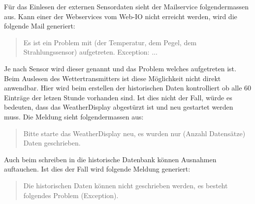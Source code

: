 Für das Einlesen der externen Sensordaten sieht der Mailservice folgendermassen aus. Kann einer der Webservices vom Web-IO nicht erreicht werden, wird die folgende Mail generiert:

\begin{quote}
Es ist ein Problem mit (der Temperatur, dem Pegel, dem Strahlungssensor) aufgetreten. Exception: ...\\
\end{quote}

Je nach Sensor wird dieser genannt und das Problem welches aufgetreten ist. Beim Auslesen des Wettertransmitters ist diese Möglichkeit nicht direkt anwendbar. Hier wird beim erstellen der historischen Daten kontrolliert ob alle 60 Einträge der letzen Stunde vorhanden sind. Ist dies nicht der Fall, würde es bedeuten, dass das WeatherDisplay abgestürzt ist und neu gestartet werden muss. Die Meldung sieht folgendermassen aus:\\

\begin{quote}
Bitte starte das WeatherDisplay neu, es wurden nur (Anzahl Datensätze) Daten geschrieben.
\end{quote}

Auch beim schreiben in die historische Datenbank können Ausnahmen auftauchen. Ist dies der Fall wird folgende Meldung generiert:\\

\begin{quote}
Die historischen Daten können nicht geschrieben werden, es besteht folgendes Problem (Exception).
\end{quote}
